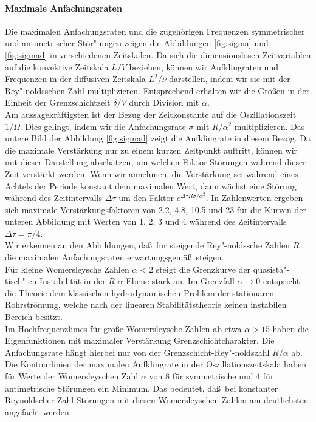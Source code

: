 \documentclass[10pt,a5paper,oneside,draft]{book}
\numberwithin{equation}{chapter}
\begin{document}
\paragraph{Maximale Anfachungsraten}
Die maximalen Anfachungsraten und die zugeh\"origen Frequenzen symmetrischer und antimetrischer St\"or"-ungen zeigen die Abbildungen \ref{fig:sigma} und \ref{fig:sigmad} in verschiedenen Zeitskalen.
Da sich die dimensionslosen Zeitvariablen auf die konvektive Zeitskala $L/V$ beziehen, k\"onnen wir Aufklingraten und Frequenzen in der diffusiven Zeitskala $L^2/\nu$ darstellen, indem wir sie mit der Rey"-noldsschen Zahl multiplizieren.
Entsprechend erhalten wir die Gr\"o\ss en in der Einheit der Grenzschichtzeit $\delta/V$ durch Division mit $\alpha$.\\
Am aussagekr\"aftigsten ist der Bezug der Zeitkonstante auf die Oszillationszeit $1/\Omega$.
Dies gelingt, indem wir die Anfachungsrate $\sigma$ mit $R/\alpha^2$ multiplizieren.
Das untere Bild der Abbildung \ref{fig:sigmad} zeigt die Aufklingrate in diesem Bezug.
Da die maximale Verst\"arkung nur zu einem kurzen Zeitpunkt auftritt, k\"onnen wir mit dieser Darstellung absch\"atzen, um welchen Faktor St\"orungen w\"ahrend dieser Zeit verst\"arkt werden.
Wenn wir annehmen, die Verst\"arkung sei w\"ahrend eines Achtels der Periode konstant dem maximalen Wert, dann w\"achst eine St\"orung w\"ahrend des Zeitintervalls $\Delta\tau$ um den Faktor $e^{\Delta\tau R\sigma/\alpha^2}$.
In Zahlenwerten ergeben sich maximale Verst\"arkungsfaktoren von 2.2, 4.8, 10.5 und 23 f\"ur die Kurven der unteren Abbildung mit Werten von 1, 2, 3 und 4 w\"ahrend des Zeitintervalls $\Delta\tau=\pi/4$.\\

Wir erkennen an den Abbildungen, da\ss\ f\"ur steigende Rey"-noldssche Zahlen $R$ die maximalen Anfachungsraten erwartungsgem\"a\ss\ steigen.\\
F\"ur kleine Womersleysche Zahlen $\alpha<2$ steigt die Grenzkurve der quasista"-tisch"-en Instabilit\"at in der $R$-$\alpha$-Ebene stark an.
Im Grenzfall $\alpha\to0$ entspricht die Theorie dem klassischen hydrodynamischen Problem der station\"aren Rohrstr\"omung, welche nach der linearen Stabilit\"atstheorie keinen instabilen Bereich besitzt.\\
Im Hochfrequenzlimes f\"ur gro\ss e Womersleysche Zahlen ab etwa $\alpha>15$ haben die Eigenfunktionen mit maximaler Verst\"arkung Grenzschichtcharakter.
Die Anfachungsrate h\"angt hierbei nur von der Grenzschicht-Rey"-noldszahl $R/\alpha$ ab.\\
Die Kontourlinien der maximalen Aufklingrate in der Oszillationszeitskala haben f\"ur Werte der Womersleyschen Zahl $\alpha$ von 8 f\"ur symmetrische und 4 f\"ur antimetrische St\"orungen ein Minimum.
Das bedeutet, da\ss\ bei konstanter Reynoldscher Zahl St\"orungen mit diesen Womersleyschen Zahlen am deutlichsten angefacht werden.\\
\end{document}
